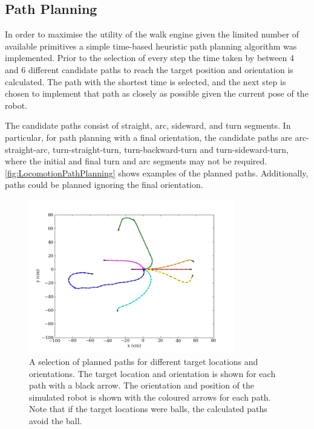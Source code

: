 \subsection{Path Planning}

In order to maximise the utility of the walk engine given the limited number of available primitives a simple time-based heuristic path planning algorithm was implemented. Prior to the selection of every step the time taken by between 4 and 6 different candidate paths to reach the target position and orientation is calculated. The path with the shortest time is selected, and the next step is chosen to implement that path as closely as possible given the current pose of the robot.

The candidate paths consist of straight, arc, sideward, and turn segments.  In particular, for path planning with a final orientation, the candidate paths are arc-straight-arc, turn-straight-turn, turn-backward-turn and turn-sideward-turn, where the initial and final turn and arc segments may not be required. \autoref{fig:LocomotionPathPlanning} shows examples of the planned paths. Additionally, paths could be planned ignoring the final orientation.

\begin{figure}[tbh]
	\begin{center}
		\includegraphics[width=0.8\textwidth]{locomotionfigs/pathplanning.png}
		\caption{A selection of planned paths for different target locations and orientations. The target location and orientation is shown for each path with a black arrow. The orientation and position of the simulated robot is shown with the coloured arrows for each path. Note that if the target locations were balls, the calculated paths avoid the ball.}
		\label{fig:LocomotionPathPlanning}
	\end{center}
\end{figure}


